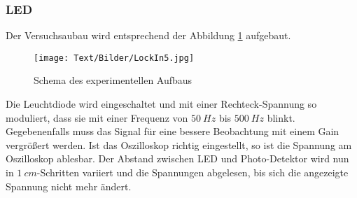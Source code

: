 \subsubsection{LED}
Der Versuchsaubau wird entsprechend der Abbildung \ref{fig:dLED} aufgebaut.
\begin{figure}[H]
  \centering
  \texttt{[image: Text/Bilder/LockIn5.jpg]}
  \caption{Schema des experimentellen Aufbaus\cite[5]{sample}}
  \label{fig:dLED}
\end{figure}
Die Leuchtdiode wird eingeschaltet und mit einer Rechteck-Spannung so moduliert, dass sie mit einer Frequenz von
$\SI{50}{Hz}$ bis $\SI{500}{Hz}$ blinkt.
Gegebenenfalls muss das Signal für eine bessere Beobachtung mit einem Gain vergrößert werden.
Ist das Oszilloskop richtig eingestellt, so ist die Spannung am Oszilloskop ablesbar.
Der Abstand zwischen LED und Photo-Detektor wird nun in $\SI{1}{cm}$-Schritten variiert und die Spannungen abgelesen,
bis sich die angezeigte Spannung nicht mehr ändert.
